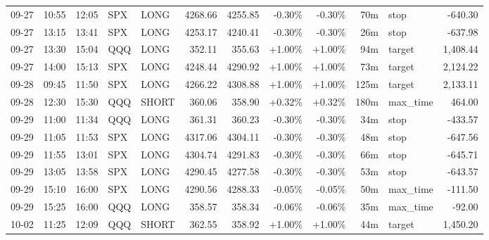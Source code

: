 \documentclass[11pt,a4paper]{article}
\begin{document}
\begin{center}
\begin{longtable}{>{\color{txtmain}}l l l l l r r r r r >{\color{txtmain}}l r}
09-27 & 10:55 & 12:05 & SPX & LONG & 4268.66 & 4255.85 & \textcolor{lossred}{-0.30\%} & \textcolor{lossred}{-0.30\%} & 70m & stop & \textcolor{lossred}{-640.30} \\
09-27 & 13:15 & 13:41 & SPX & LONG & 4253.17 & 4240.41 & \textcolor{lossred}{-0.30\%} & \textcolor{lossred}{-0.30\%} & 26m & stop & \textcolor{lossred}{-637.98} \\
09-27 & 13:30 & 15:04 & QQQ & LONG & 352.11 & 355.63 & \textcolor{wingreen}{+1.00\%} & \textcolor{wingreen}{+1.00\%} & 94m & target & \textcolor{wingreen}{1,408.44} \\
09-27 & 14:00 & 15:13 & SPX & LONG & 4248.44 & 4290.92 & \textcolor{wingreen}{+1.00\%} & \textcolor{wingreen}{+1.00\%} & 73m & target & \textcolor{wingreen}{2,124.22} \\
09-28 & 09:45 & 11:50 & SPX & LONG & 4266.22 & 4308.88 & \textcolor{wingreen}{+1.00\%} & \textcolor{wingreen}{+1.00\%} & 125m & target & \textcolor{wingreen}{2,133.11} \\
09-28 & 12:30 & 15:30 & QQQ & SHORT & 360.06 & 358.90 & \textcolor{wingreen}{+0.32\%} & \textcolor{wingreen}{+0.32\%} & 180m & max\_time & \textcolor{wingreen}{464.00} \\
09-29 & 11:00 & 11:34 & QQQ & LONG & 361.31 & 360.23 & \textcolor{lossred}{-0.30\%} & \textcolor{lossred}{-0.30\%} & 34m & stop & \textcolor{lossred}{-433.57} \\
09-29 & 11:05 & 11:53 & SPX & LONG & 4317.06 & 4304.11 & \textcolor{lossred}{-0.30\%} & \textcolor{lossred}{-0.30\%} & 48m & stop & \textcolor{lossred}{-647.56} \\
09-29 & 11:55 & 13:01 & SPX & LONG & 4304.74 & 4291.83 & \textcolor{lossred}{-0.30\%} & \textcolor{lossred}{-0.30\%} & 66m & stop & \textcolor{lossred}{-645.71} \\
09-29 & 13:05 & 13:58 & SPX & LONG & 4290.45 & 4277.58 & \textcolor{lossred}{-0.30\%} & \textcolor{lossred}{-0.30\%} & 53m & stop & \textcolor{lossred}{-643.57} \\
09-29 & 15:10 & 16:00 & SPX & LONG & 4290.56 & 4288.33 & \textcolor{lossred}{-0.05\%} & \textcolor{lossred}{-0.05\%} & 50m & max\_time & \textcolor{lossred}{-111.50} \\
09-29 & 15:25 & 16:00 & QQQ & LONG & 358.57 & 358.34 & \textcolor{lossred}{-0.06\%} & \textcolor{lossred}{-0.06\%} & 35m & max\_time & \textcolor{lossred}{-92.00} \\
10-02 & 11:25 & 12:09 & QQQ & SHORT & 362.55 & 358.92 & \textcolor{wingreen}{+1.00\%} & \textcolor{wingreen}{+1.00\%} & 44m & target & \textcolor{wingreen}{1,450.20} \\

\end{longtable}
\end{center}
\end{document}
